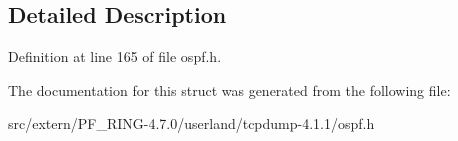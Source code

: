 \subsection{Detailed Description}


Definition at line 165 of file ospf.h.



The documentation for this struct was generated from the following file:\begin{DoxyCompactItemize}
\item 
src/extern/PF\_\-RING-\/4.7.0/userland/tcpdump-\/4.1.1/ospf.h\end{DoxyCompactItemize}
